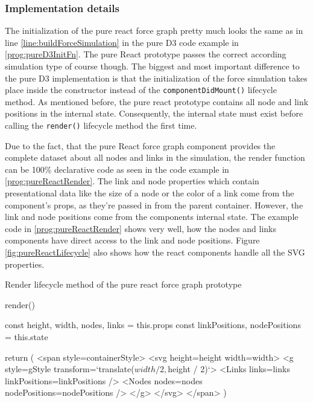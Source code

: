 \subsubsection{Implementation details}

The initialization of the pure react force graph pretty much looks the same as in line \ref{line:buildForceSimulation} in the pure D3 code example in \ref{prog:pureD3InitFn}. The pure React prototype passes the correct according simulation type of course though. The biggest and most important difference to the pure D3 implementation is that the initialization of the force simulation takes place inside the constructor instead of the \texttt{componentDidMount()} lifecycle method. As mentioned before, the pure react prototype contains all node and link positions in the internal state. Consequently, the internal state must exist before calling the \texttt{render()} lifecycle method the first time.

Due to the fact, that the pure React force graph component provides the complete dataset about all nodes and links in the simulation, the render function can be 100\% declarative code as seen in the code example in \ref{prog:pureReactRender}. The link and node properties which contain presentational data like the size of a node or the color of a link come from the component's props, as they're passed in from the parent container. However, the link and node positions come from the components internal state. The example code in \ref{prog:pureReactRender} shows very well, how the nodes and links components have direct access to the link and node positions. Figure \ref{fig:pureReactLifecycle} also shows how the react components handle all the SVG properties.

\begin{program}
\caption{Render lifecycle method of the pure react force graph prototype}
\label{prog:pureReactRender}
\begin{JsCode}
render() {
  const { height, width, nodes, links } = this.props
  const { linkPositions, nodePositions } = this.state
  
  return (
    <span style={containerStyle}>
      <svg height={height} width={width}>
        <g style={gStyle} transform={`translate(${width / 2},${height / 2})`}>
          <Links links={links} linkPositions={linkPositions} />
          <Nodes nodes={nodes} nodePositions={nodePositions} />
        </g>
      </svg>
    </span>
  )
}
\end{JsCode}
\end{program}

